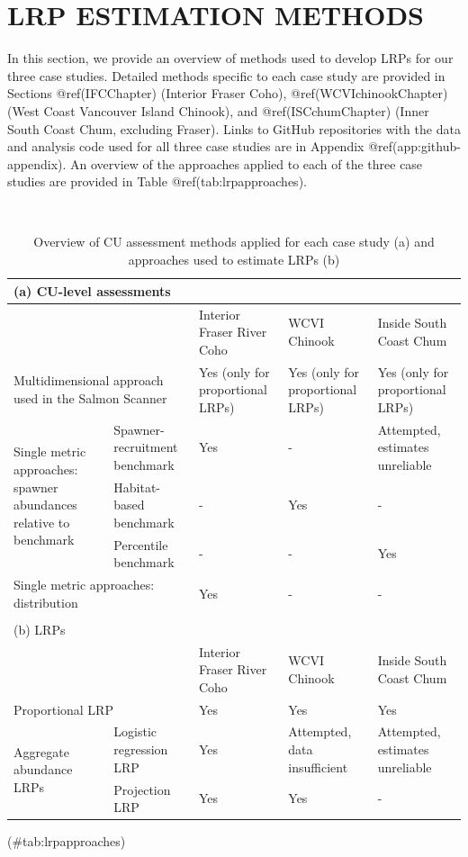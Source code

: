 \documentclass[
]{article}
\author{}
\date{\vspace{-2.5em}}
\begin{document}
\hypertarget{MethodsChapter}{%
\section{LRP ESTIMATION METHODS}\label{MethodsChapter}}

In this section, we provide an overview of methods used to develop LRPs
for our three case studies. Detailed methods specific to each case study
are provided in Sections @ref(IFCChapter) (Interior Fraser Coho),
@ref(WCVIchinookChapter) (West Coast Vancouver Island Chinook), and
@ref(ISCchumChapter) (Inner South Coast Chum, excluding Fraser). Links
to GitHub repositories with the data and analysis code used for all
three case studies are in Appendix @ref(app:github-appendix). An
overview of the approaches applied to each of the three case studies are
provided in Table @ref(tab:lrpapproaches).

~ ~

\renewcommand*{\arraystretch}{1.4}
\begin{table}[!htbp]
\setlength\heavyrulewidth{0.25ex}
\centering
\footnotesize   
\caption{Overview of CU assessment methods applied for each case study (a) and approaches used to estimate LRPs (b) }
\begin{tabular}{p{3.2cm} p{3.2cm} p{2.4cm} p{2.4cm} p{2.4cm}}
\multicolumn{5}{l}{(a) CU-level assessments }\\
\toprule
\multicolumn{2}{l}{} & Interior Fraser River Coho & WCVI Chinook & Inside South Coast Chum \\
\toprule
\multicolumn{2}{l}{\parbox{5.8cm}{Multidimensional approach used in the Salmon Scanner}}& Yes (only for proportional LRPs) &   Yes (only for proportional LRPs)  &  Yes (only for proportional LRPs)\\
\midrule
\multirow{3}{*}{\parbox{3.2cm}{Single metric approaches: spawner abundances relative to benchmark}} & Spawner-recruitment benchmark & Yes & - & Attempted, estimates unreliable\\
\cline{2-5}
& Habitat-based benchmark & - & Yes & -\\
\cline{2-5}
& Percentile benchmark & - & - & Yes\\
\cline{1-5}
\multicolumn{2}{l}{Single metric approaches: distribution} & Yes & - & - \\
\bottomrule
\multicolumn{5}{l}{ }\\
\multicolumn{5}{l}{(b) LRPs }\\
\toprule
\multicolumn{2}{l}{} & Interior Fraser River Coho & WCVI Chinook & Inside South Coast Chum \\
\toprule
\multicolumn{2}{l}{Proportional LRP} &  Yes &   Yes &   Yes\\
\midrule
\multirow{2}{*}{\parbox{3.2cm}{Aggregate abundance LRPs}} & Logistic regression LRP & Yes & Attempted, data insufficient &  Attempted, estimates unreliable \\ 
\cline{2-5}
 & Projection LRP & Yes  & Yes &  - \\
\bottomrule
\end{tabular}
(\#tab:lrpapproaches)
\end{table}
\end{document}
